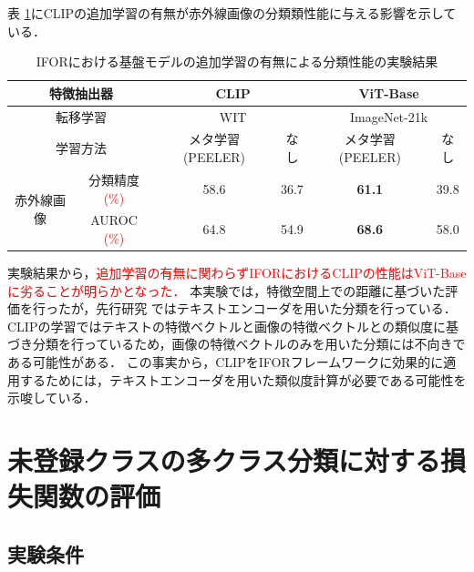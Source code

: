 \documentclass[a4paper,11pt,nomag]{jsreport}
\begin{document}
表 \ref{tbl:exp3}にCLIPの追加学習の有無が赤外線画像の分類類性能に与える影響を示している．
% 
\begin{table}[tbp]
  \centering
  \caption{IFORにおける基盤モデルの追加学習の有無による分類性能の実験結果}
  \label{tbl:exp3}

  \begin{tabular}{cc||c|c|c|c}
      \hline
      \multicolumn{2}{c||}{特徴抽出器}      & \multicolumn{2}{c|}{CLIP} & \multicolumn{2}{c}{ViT-Base} \\ \hline
      \multicolumn{2}{c||}{転移学習}       &  \multicolumn{2}{c|}{WIT}  & \multicolumn{2}{c}{ImageNet-21k} \\ \hline
      \multicolumn{2}{c||}{学習方法}       & メタ学習 (PEELER) &   なし   & メタ学習 (PEELER) &    なし    \\ \hline\hline
      \multirow{2}{*}{赤外線画像} & 分類精度 \textcolor{red}{(\%)} &       58.6      &   36.7   &  \textbf{61.1}  &    39.8    \\
                                & AUROC \textcolor{red}{(\%)}   &       64.8      &   54.9   &  \textbf{68.6}  &    58.0    \\ \hline
  \end{tabular}
\end{table}
% 
実験結果から，\textcolor{red}{追加学習の有無に関わらずIFORにおけるCLIPの性能はViT-Baseに劣ることが明らかとなった．}
本実験では，特徴空間上での距離に基づいた評価を行ったが，先行研究 \cite{clip}ではテキストエンコーダを用いた分類を行っている．
CLIPの学習ではテキストの特徴ベクトルと画像の特徴ベクトルとの類似度に基づき分類を行っているため，画像の特徴ベクトルのみを用いた分類には不向きである可能性がある．
この事実から，CLIPをIFORフレームワークに効果的に適用するためには，テキストエンコーダを用いた類似度計算が必要である可能性を示唆している．

\section{未登録クラスの多クラス分類に対する損失関数の評価}

\subsection{実験条件}
\end{document}
